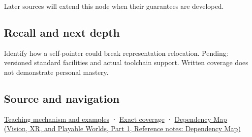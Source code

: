 \hypertarget{appendix-adfd6397af8d-used-by}{}

Later sources will extend this node when their guarantees are developed.

\subsection{Recall and next depth}\label{appendix-adfd6397af8d-recall-and-next-depth}

\hypertarget{appendix-adfd6397af8d-recall-and-next-depth}{}

Identify how a self-pointer could break representation relocation. Pending: versioned standard facilities and actual toolchain support. Written coverage does not demonstrate personal mastery.

\subsection{Source and navigation}\label{appendix-adfd6397af8d-source-and-navigation}

\hypertarget{appendix-adfd6397af8d-source-and-navigation}{}

\hyperref[01-foundations-i-ch003-from-three-repairs-to-five-decisions-to-zero-boilerplate]{Teaching mechanism and examples} · \hyperref[appendix-fd090d982a15-m009---parts-127-147]{Exact coverage} · \href{../07-Vision-XR-and-Playable-Worlds-P01/main.pdf\#appendix-4ad47bdd269a}{Dependency Map (Vision, XR, and Playable Worlds, Part 1, Reference notes: Dependency Map)}

